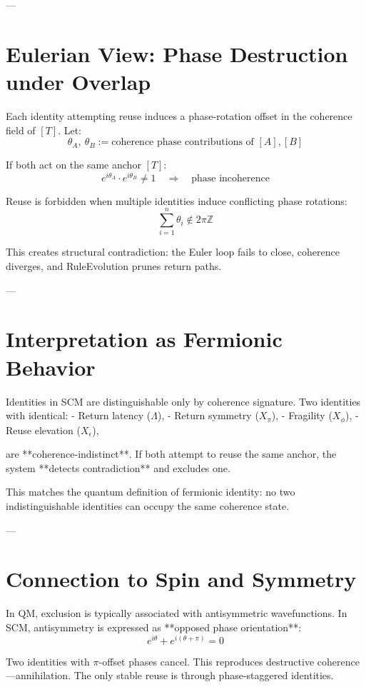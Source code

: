 ---

\section{Eulerian View: Phase Destruction under Overlap}

Each identity attempting reuse induces a phase-rotation offset in the coherence field of $[T]$. Let:
\[
\theta_A,\ \theta_B := \text{coherence phase contributions of } [A], [B]
\]

If both act on the same anchor $[T]$:
\[
e^{i\theta_A} \cdot e^{i\theta_B} \ne 1 \quad \Rightarrow \quad \text{phase incoherence}
\]

\begin{definition}
Reuse is forbidden when multiple identities induce conflicting phase rotations:
\[
\sum_{i=1}^n \theta_i \notin 2\pi \mathbb{Z}
\]
\end{definition}

This creates structural contradiction: the Euler loop fails to close, coherence diverges, and RuleEvolution prunes return paths.

---

\section{Interpretation as Fermionic Behavior}

Identities in SCM are distinguishable only by coherence signature. Two identities with identical:
- Return latency ($\Lambda$),
- Return symmetry ($X_\pi$),
- Fragility ($X_\phi$),
- Reuse elevation ($X_\epsilon$),

are **coherence-indistinct**. If both attempt to reuse the same anchor, the system **detects contradiction** and excludes one.

This matches the quantum definition of fermionic identity: no two indistinguishable identities can occupy the same coherence state.

---

\section{Connection to Spin and Symmetry}

In QM, exclusion is typically associated with antisymmetric wavefunctions. In SCM, antisymmetry is expressed as **opposed phase orientation**:
\[
e^{i\theta} + e^{i(\theta + \pi)} = 0
\]

Two identities with $\pi$-offset phases cancel. This reproduces destructive coherence—annihilation. The only stable reuse is through phase-staggered identities.


